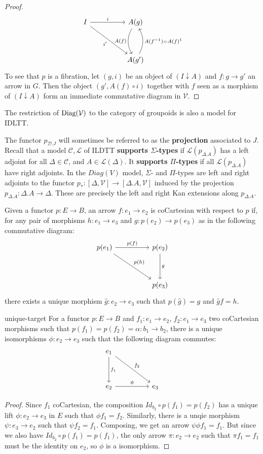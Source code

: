 \begin{thm}
\begin{lemm}
\begin{proof}
\[
\ti
I \ar[rd,"i'",swap] \ar[r, "i"] & A(g) \ar[d, "A(f)", bend right,swap] \\
& A(g') \ar[u, "A(f^{-1}) = A(f)^{1}", bend right,swap]
\kz
\]
To see that $p$ is a fibration, let $(g, i)$ be an object of $(I \downarrow A)$ and $f : g \to g'$ an arrow in $G$. Then the object $(g', A(f)\circ i)$ together with $f$ seen as a morphism of $(I \downarrow A)$ form an immediate commutative diagram in $\mathcal{V}$.
\end{proof}
\end{lemm}
\begin{corl}
The restriction of $\operatorname{\text{Diag}}(\mathcal{V})$ to the category of groupoids is also a model for IDLTT.
\end{corl}

\end{thm}
The functor $p_{\mathcal{D}.J}$ will sometimes be referred to as the \textbf{projection} associated to $J$.
Recall that a model $\mathcal{C}, \mathcal{L}$ of ILDTT \textbf{supports $\Sigma$-types} if $\mathcal{L}(p_{\Delta.A})$ has a left adjoint for all $\Delta \in \mathcal{C}$, and $A \in \mathcal{L}(\Delta)$. It \textbf{supports $\Pi$-types} if all $\mathcal{L}(p_{\Delta.A})$ have right adjoints.
In the $Diag(V)$ model, $\Sigma$- and $\Pi$-types are left and right adjoints to the functor $p_* : [\Delta, \mathcal{V}] \to [\Delta.A, \mathcal{V}]$ induced by the projection $p_{\Delta.A} : \Delta.A \to \Delta$. These are precisely the left and right Kan extensions along $p_{\Delta.A}$.
\begin{defn}
Given a functor $p : E \to B$, an arrow $f : e_1 \to e_2$ is coCartesian with respect to $p$ if, for any pair of morphisms $h : e_1 \to e_3$ and $g : p(e_2) \to p(e_3)$ as in the following commutative diagram:
\[
\ti
p(e_1) \ar[r, "p(f)"] \ar[rd, "p(h)"] & p(e_2) \ar[d, "g"] \\
& p(e_3)
\kz
\]
there exists a unique morphism $\hat g : e_2 \to e_3$ such that $p(\hat g) = g$ and $\hat g f = h$.
\end{defn}
\begin{lemm}{unique-target}
For a functor $p : E \to B$ and $f_1 : e_1 \to e_2$, $f_2 : e_1 \to e_3$ two coCartesian morphisms such that $p(f_1) = p(f_2) = \alpha : b_1 \to b_2$, there is a unique isomorphisms $\phi : e_2 \to e_3$ such that the following diagram commutes:
\[
\ti
e_1 \ar[d, "f_1"] \ar[rd, "f_2"] & \\
e_2 \ar[r,"\phi"] &  e_3
\kz
\]
\begin{proof}
Since $f_1$ coCartesian, the composition $Id_{b_2} \circ p(f_1) = p(f_2)$ has a unique lift $\phi : e_2 \to e_3$ in $E$ such that $\phi f_1 = f_2$. Similarly, there is a unqie morphism $\psi : e_3 \to e_2$ such that $\psi f_2 = f_1$. Composing, we get an arrow $\psi \phi f_1 = f_1$. But since we also have $Id_{b_2} \circ p(f_1) = p(f_1)$, the only arrow $\pi : e_2 \to e_2$ such that $\pi f_1 = f_1$ must be the identity on $e_2$, so $\phi$ is a isomorphism.
\end{proof}
\end{lemm}

